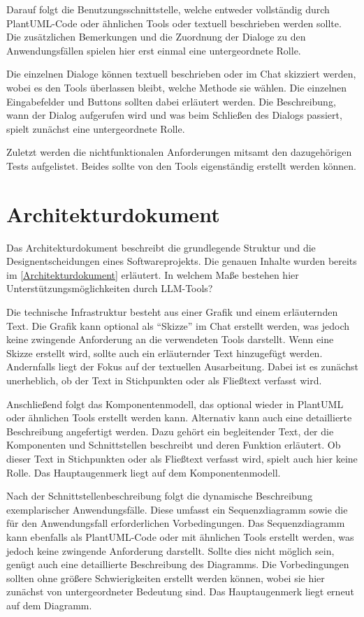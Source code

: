 Darauf folgt die Benutzungsschnittstelle, welche entweder vollständig durch PlantUML-Code oder ähnlichen Tools 
oder textuell beschrieben werden sollte. Die zusätzlichen Bemerkungen und die Zuordnung der Dialoge zu den Anwendungsfällen 
spielen hier erst einmal eine untergeordnete Rolle.

Die einzelnen Dialoge können textuell beschrieben oder im Chat skizziert werden, wobei es den Tools überlassen 
bleibt, welche Methode sie wählen. Die einzelnen Eingabefelder und Buttons sollten dabei erläutert werden. 
Die Beschreibung, wann der Dialog aufgerufen wird und was beim Schließen des Dialogs passiert, spielt zunächst 
eine untergeordnete Rolle.

Zuletzt werden die nichtfunktionalen Anforderungen mitsamt den dazugehörigen Tests aufgelistet. Beides sollte 
von den Tools eigenständig erstellt werden können.

\section{Architekturdokument}  \label{LLMArchitekturdokument}

Das Architekturdokument beschreibt die grundlegende Struktur und die Designentscheidungen eines Softwareprojekts. 
Die genauen Inhalte wurden bereits im \autoref{Architekturdokument} erläutert. In welchem Maße bestehen hier 
Unterstützungsmöglichkeiten durch LLM-Tools?

Die technische Infrastruktur besteht aus einer Grafik und einem erläuternden Text. Die Grafik kann optional als 
``Skizze'' im Chat erstellt werden, was jedoch keine zwingende Anforderung an die verwendeten Tools darstellt. 
Wenn eine Skizze erstellt wird, sollte auch ein erläuternder Text hinzugefügt werden. Andernfalls liegt der 
Fokus auf der textuellen Ausarbeitung. Dabei ist es zunächst unerheblich, ob der Text in Stichpunkten oder als 
Fließtext verfasst wird.

Anschließend folgt das Komponentenmodell, das optional wieder in PlantUML oder ähnlichen Tools erstellt werden 
kann. Alternativ kann auch eine detaillierte Beschreibung angefertigt werden. Dazu gehört ein begleitender Text, 
der die Komponenten und Schnittstellen beschreibt und deren Funktion erläutert. Ob dieser Text in Stichpunkten 
oder als Fließtext verfasst wird, spielt auch hier keine Rolle. Das Hauptaugenmerk liegt auf dem Komponentenmodell.

Nach der Schnittstellenbeschreibung folgt die dynamische Beschreibung exemplarischer Anwendungsfälle. Diese umfasst 
ein Sequenzdiagramm sowie die für den Anwendungsfall erforderlichen Vorbedingungen. Das Sequenzdiagramm kann ebenfalls 
als PlantUML-Code oder mit ähnlichen Tools erstellt werden, was jedoch keine zwingende Anforderung darstellt. Sollte 
dies nicht möglich sein, genügt auch eine detaillierte Beschreibung des Diagramms. Die Vorbedingungen sollten ohne 
größere Schwierigkeiten erstellt werden können, wobei sie hier zunächst von untergeordneter Bedeutung sind. Das 
Hauptaugenmerk liegt erneut auf dem Diagramm.


